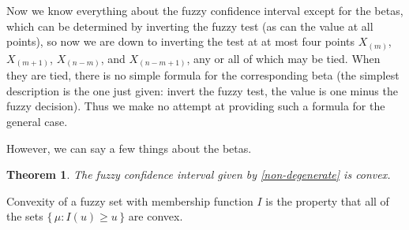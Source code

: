 \documentclass{article}
\newtheorem{theorem}{Theorem}
\begin{document}
Now we know everything about the fuzzy confidence interval except for
the betas, which can be determined by inverting the fuzzy test (as can
the value at all points), so now we are down to inverting the test at
at most four points
$X_{(m)}$, $X_{(m + 1)}$, $X_{(n - m)}$, and $X_{(n - m + 1)}$, any or
all of which may be tied.  When they are tied, there is no simple formula
for the corresponding beta (the simplest description is the one just given:
invert the fuzzy test, the value is one minus the fuzzy decision).
Thus we make no attempt at providing such a formula for the general case.

However, we can say a few things about the betas.
\begin{theorem} \label{th:convex}
The fuzzy confidence interval given by \eqref{non-degenerate} is convex.
\end{theorem}
Convexity of a fuzzy set with membership function $I$ is the property
that all of the sets $\{\, \mu : I(u) \ge u \,\}$ are convex.
\end{document}
